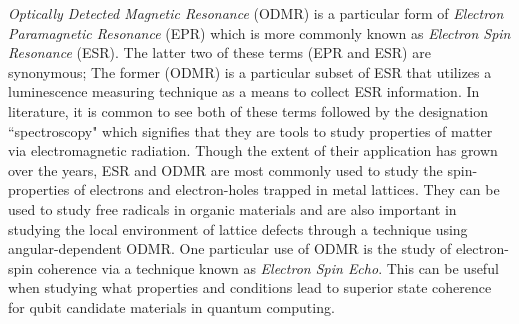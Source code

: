 \documentclass[oneside, astronomy, noacknowlegments]{BYUPhys}
\begin{document}
\textit{Optically Detected Magnetic Resonance} (ODMR) is a particular form of \textit{Electron Paramagnetic Resonance} (EPR) which is more commonly known as \textit{Electron Spin Resonance} (ESR). The latter two of these terms (EPR and ESR) are synonymous; The former (ODMR) is a particular subset of ESR that utilizes a luminescence measuring technique as a means to collect ESR information. In literature, it is common to see both of these terms followed by the designation ``spectroscopy" which signifies that they are tools to study properties of matter via electromagnetic radiation. Though the extent of their application has grown over the years, ESR and ODMR are most commonly used to study the spin-properties of electrons and electron-holes trapped in metal lattices. They can be used to study free radicals \cite{RefWorks:doc:589299ede4b0dec22aee3bd4} in organic materials and are also important in studying the local environment of lattice defects through a technique using angular-dependent ODMR. One particular use of ODMR is the study of electron-spin coherence via a technique known as \textit{Electron Spin Echo}. This can be useful when studying what properties and conditions lead to superior state coherence \cite{RefWorks:doc:58929786e4b0228a292929b8} for qubit candidate materials in quantum computing.
\end{document}
